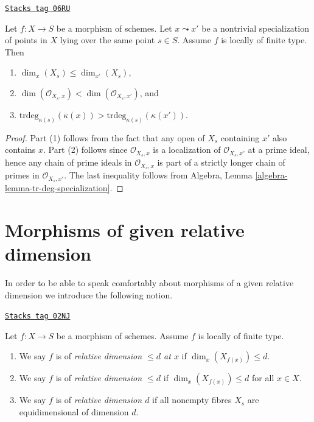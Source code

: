 \begin{lemma}
\label{morphisms-lemma-dimension-fibre-specialization}
\href{https://stacks.math.columbia.edu/tag/06RU}{\texttt{Stacks tag 06RU}}

Let $f : X \to S$ be a morphism of schemes.
Let $x \leadsto x'$ be a nontrivial specialization of points in $X$
lying over the same point $s \in S$. Assume $f$ is locally of finite type.
Then
\begin{enumerate}
\item $\dim_x(X_s) \leq \dim_{x'}(X_s)$,
\item $\dim(\mathcal{O}_{X_s, x}) < \dim(\mathcal{O}_{X_s, x'})$, and
\item $\text{trdeg}_{\kappa(s)}(\kappa(x)) >
\text{trdeg}_{\kappa(s)}(\kappa(x'))$.
\end{enumerate}
\end{lemma}

\begin{proof}
Part (1) follows from the fact that any open of $X_s$ containing $x'$
also contains $x$. Part (2) follows since $\mathcal{O}_{X_s, x}$ is a
localization of $\mathcal{O}_{X_s, x'}$ at a prime ideal, hence any chain
of prime ideals in $\mathcal{O}_{X_s, x}$ is part of a strictly longer
chain of primes in $\mathcal{O}_{X_s, x'}$. The last inequality follows from
Algebra, Lemma \ref{algebra-lemma-tr-deg-specialization}.
\end{proof}

\section{Morphisms of given relative dimension}
\label{morphisms-section-relative-dimension}
In order to be able to speak comfortably about morphisms of a
given relative dimension we introduce the following notion.

\begin{definition}
\label{morphisms-definition-relative-dimension-d}
\href{https://stacks.math.columbia.edu/tag/02NJ}{\texttt{Stacks tag 02NJ}}

Let $f : X \to S$ be a morphism of schemes.
Assume $f$ is locally of finite type.
\begin{enumerate}
\item We say $f$ is of {\it relative dimension $\leq d$ at $x$} if
$\dim_x(X_{f(x)}) \leq d$.
\item We say $f$ is of {\it relative dimension $\leq d$} if
$\dim_x(X_{f(x)}) \leq d$ for all $x \in X$.
\item We say $f$ is of {\it relative dimension $d$} if
all nonempty fibres $X_s$ are equidimensional of dimension $d$.
\end{enumerate}
\end{definition}

